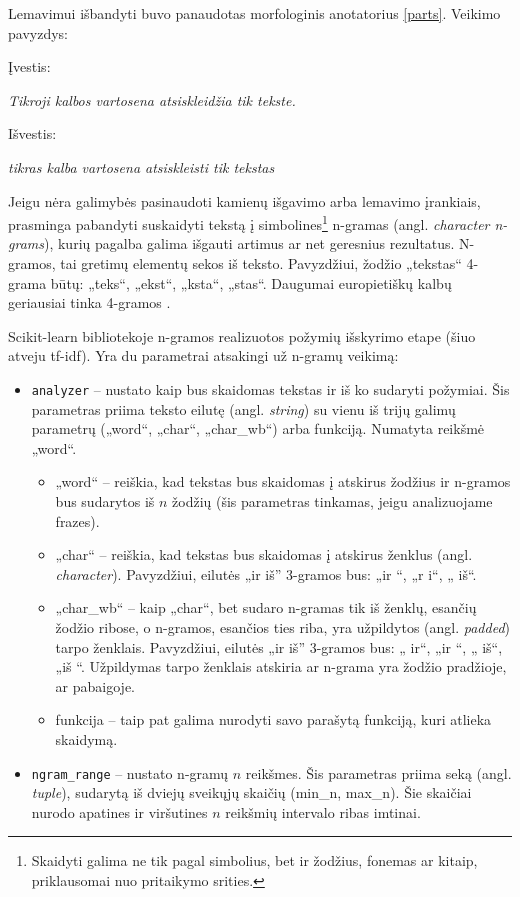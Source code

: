 \documentclass{VUMIFInfBakalaurinis}
\begin{document}
Lemavimui išbandyti buvo panaudotas morfologinis anotatorius \ref{parts}. Veikimo
pavyzdys:

Įvestis:

\emph{Tikroji kalbos vartosena atsiskleidžia tik tekste.}

Išvestis:

\emph{tikras kalba vartosena atsiskleisti tik tekstas}

\label{ngram}

Jeigu nėra galimybės pasinaudoti kamienų išgavimo arba lemavimo
įrankiais, prasminga pabandyti suskaidyti tekstą į simbolines\footnote{Skaidyti
  galima ne tik pagal simbolius, bet ir žodžius, fonemas ar kitaip,
  priklausomai nuo pritaikymo srities.} n-gramas (angl. \emph{character
n-grams}), kurių pagalba galima išgauti artimus ar net geresnius
rezultatus. N-gramos, tai gretimų elementų sekos iš teksto. Pavyzdžiui,
žodžio „tekstas“ 4-grama būtų: „teks“, „ekst“, „ksta“, „stas“.
Daugumai europietiškų kalbų geriausiai tinka 4-gramos \cite{mcnamee2008don}.

Scikit-learn bibliotekoje n-gramos realizuotos požymių išskyrimo etape
(šiuo atveju tf-idf). Yra du parametrai atsakingi už n-gramų veikimą:

\begin{itemize}
\item
  \texttt{analyzer} -- nustato kaip bus skaidomas tekstas ir iš ko
  sudaryti požymiai. Šis parametras priima teksto eilutę (angl.
  \emph{string}) su vienu iš trijų galimų parametrų („word“, „char“,
  „char\_wb“) arba funkciją. Numatyta reikšmė „word“.

  \begin{itemize}
  \item
    „word“ -- reiškia, kad tekstas bus skaidomas į atskirus žodžius ir
    n-gramos bus sudarytos iš $n$ žodžių (šis parametras tinkamas,
    jeigu analizuojame frazes).
  \item
    „char“ -- reiškia, kad tekstas bus skaidomas į atskirus ženklus
    (angl. \emph{character}). Pavyzdžiui, eilutės „ir iš'' 3-gramos bus:
    „ir “, „r i“, „ iš“.
  \item
    „char\_wb“ -- kaip „char“, bet sudaro n-gramas tik iš ženklų,
    esančių žodžio ribose, o n-gramos, esančios ties riba, yra
    užpildytos (angl. \emph{padded}) tarpo ženklais. Pavyzdžiui, eilutės
    „ir iš'' 3-gramos bus: „ ir“, „ir “, „ iš“, „iš “. Užpildymas
    tarpo ženklais atskiria ar n-grama yra žodžio pradžioje, ar
    pabaigoje.
  \item
    funkcija -- taip pat galima nurodyti savo parašytą funkciją, kuri
    atlieka skaidymą.
  \end{itemize}
\item
  \texttt{ngram\_range} -- nustato n-gramų $n$ reikšmes. Šis
  parametras priima seką (angl. \emph{tuple}), sudarytą iš dviejų
  sveikųjų skaičių (min\_n, max\_n). Šie skaičiai nurodo apatines ir
  viršutines $n$ reikšmių intervalo ribas imtinai.
\end{itemize}
\end{document}
